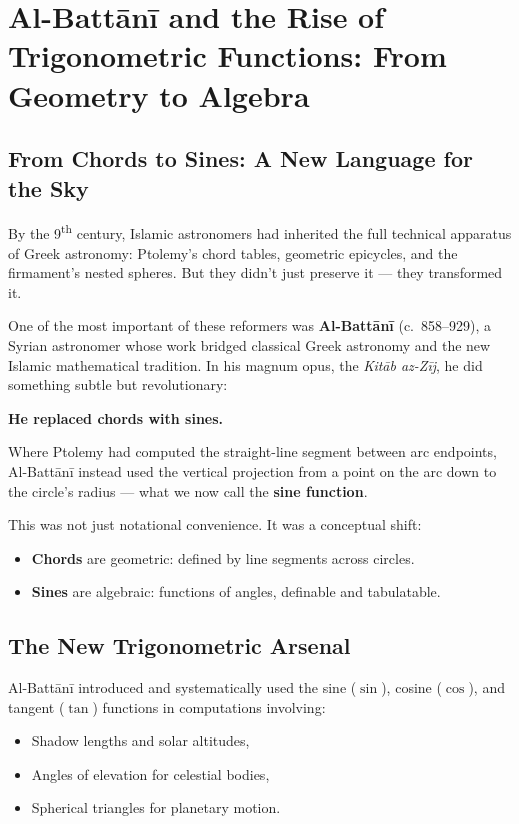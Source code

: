 \section{Al-Battānī and the Rise of Trigonometric Functions: From Geometry to Algebra}

\subsection{From Chords to Sines: A New Language for the Sky}

By the 9\textsuperscript{th} century, Islamic astronomers had inherited the full technical apparatus of Greek astronomy: Ptolemy’s chord tables, geometric epicycles, and the firmament's nested spheres. But they didn’t just preserve it — they transformed it.

One of the most important of these reformers was \textbf{Al-Battānī} (c.~858–929), a Syrian astronomer whose work bridged classical Greek astronomy and the new Islamic mathematical tradition. In his magnum opus, the \textit{Kitāb az-Zīj}, he did something subtle but revolutionary:

\textbf{He replaced chords with sines.}

Where Ptolemy had computed the straight-line segment between arc endpoints, Al-Battānī instead used the vertical projection from a point on the arc down to the circle’s radius — what we now call the \textbf{sine function}.

\medskip

This was not just notational convenience. It was a conceptual shift:

\begin{itemize}
    \item \textbf{Chords} are geometric: defined by line segments across circles.
    \item \textbf{Sines} are algebraic: functions of angles, definable and tabulatable.
\end{itemize}



\subsection{The New Trigonometric Arsenal}

Al-Battānī introduced and systematically used the sine (\( \sin \)), cosine (\( \cos \)), and tangent (\( \tan \)) functions in computations involving:

\begin{itemize}
    \item Shadow lengths and solar altitudes,
    \item Angles of elevation for celestial bodies,
    \item Spherical triangles for planetary motion.
\end{itemize}

